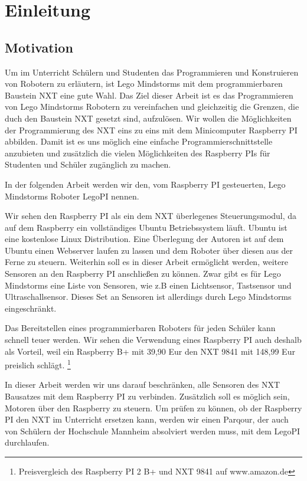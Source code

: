 \chapter{Einleitung}

\section{Motivation}
Um im Unterricht Schülern und Studenten das Programmieren und Konstruieren von Robotern zu erläutern, ist Lego Mindstorms mit dem programmierbaren Baustein NXT eine gute Wahl. Das Ziel dieser Arbeit ist es das Programmieren von Lego Mindstorms Robotern zu vereinfachen und gleichzeitig die Grenzen, die duch den Baustein NXT gesetzt sind, aufzulösen. Wir wollen die Möglichkeiten der Programmierung des NXT eins zu eins mit dem Minicomputer Raspberry PI abbilden. Damit ist es uns möglich eine einfache Programmierschnittstelle anzubieten und zusätzlich die vielen Möglichkeiten des Raspberry PIs für Studenten und Schüler zugänglich zu machen. 

In der folgenden Arbeit werden wir den, vom Raspberry PI gesteuerten, Lego Mindstorms Roboter LegoPI nennen.

Wir sehen den Raspberry PI als ein dem NXT überlegenes Steuerungsmodul, da auf dem Raspberry ein vollständiges Ubuntu Betriebssystem läuft. Ubuntu ist eine kostenlose Linux Distribution. Eine Überlegung der Autoren ist auf dem Ubuntu einen Webserver laufen zu lassen und dem Roboter über diesen aus der Ferne zu steuern.
Weiterhin soll es in dieser Arbeit ermöglicht werden, weitere Sensoren an den Raspberry PI anschließen zu können. Zwar gibt es für Lego Mindstorms eine Liste von Sensoren, wie z.B einen Lichtsensor, Tastsensor und Ultraschallsensor. Dieses Set an Sensoren ist allerdings durch Lego Mindstorms eingeschränkt.

Das Bereitstellen eines programmierbaren Roboters für jeden Schüler kann schnell teuer werden. Wir sehen die Verwendung eines Raspberry PI auch deshalb als Vorteil, weil ein Raspberry B+ mit 39,90 Eur den NXT 9841 mit 148,99 Eur preislich schlägt. \footnote{Preisvergleich des Raspberry PI 2 B+ und NXT 9841 auf www.amazon.de}

In dieser Arbeit werden wir uns darauf beschränken, alle Sensoren des NXT Bausatzes mit dem Raspberry PI zu verbinden. Zusätzlich soll es möglich sein, Motoren über den Raspberry zu steuern. Um prüfen zu können, ob der Raspberry PI den NXT im Unterricht ersetzen kann, werden wir einen Parqour, der auch von Schülern der Hochschule Mannheim absolviert werden muss, mit dem LegoPI durchlaufen.

